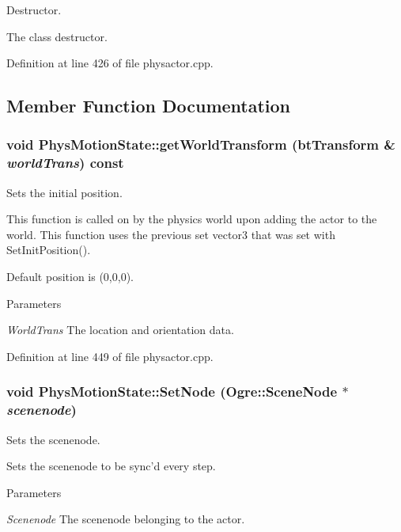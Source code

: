 Destructor. 

The class destructor. 

Definition at line 426 of file physactor.cpp.



\subsection{Member Function Documentation}
\hypertarget{classPhysMotionState_ad7f6fc932da90cc2a718fbe809d95287}{
\subsubsection[{getWorldTransform}]{\setlength{\rightskip}{0pt plus 5cm}void PhysMotionState::getWorldTransform (btTransform \& {\em worldTrans}) const}}
\label{d2/d14/classPhysMotionState_ad7f6fc932da90cc2a718fbe809d95287}


Sets the initial position. 

This function is called on by the physics world upon adding the actor to the world. This function uses the previous set vector3 that was set with SetInitPosition(). \par
 Default position is (0,0,0). 
\begin{DoxyParams}{Parameters}
\item[{\em WorldTrans}]The location and orientation data. \end{DoxyParams}


Definition at line 449 of file physactor.cpp.

\hypertarget{classPhysMotionState_a4ba21f0b58f33197b61cf1a9754027bc}{
\subsubsection[{SetNode}]{\setlength{\rightskip}{0pt plus 5cm}void PhysMotionState::SetNode (Ogre::SceneNode $\ast$ {\em scenenode})}}
\label{d2/d14/classPhysMotionState_a4ba21f0b58f33197b61cf1a9754027bc}


Sets the scenenode. 

Sets the scenenode to be sync'd every step. 
\begin{DoxyParams}{Parameters}
\item[{\em Scenenode}]The scenenode belonging to the actor. \end{DoxyParams}


